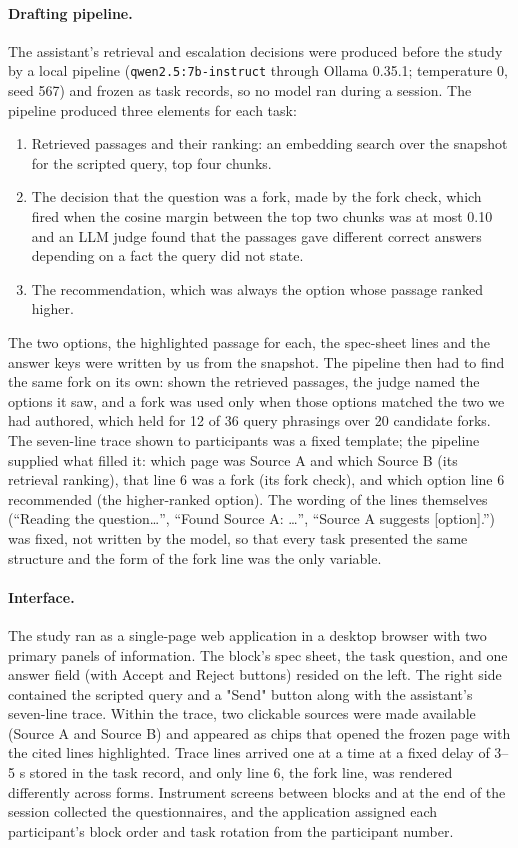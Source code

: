 \documentclass[manuscript,review]{acmart}
\begin{document}
\paragraph{Drafting pipeline.} The assistant's retrieval and escalation
decisions were produced before the study by a local pipeline
(\texttt{qwen2.5:7b-instruct} through Ollama 0.35.1; temperature 0, seed
567) and frozen as task records, so no model ran during a session. The pipeline produced three elements for each task:
\begin{enumerate}
    \item Retrieved passages and their ranking: an embedding search over the snapshot for the scripted query, top four chunks.
    \item The decision that the question was a fork, made by the fork check, which fired when the cosine margin between the top two chunks was at most 0.10 and an LLM judge found that the passages gave different correct answers depending on a fact the query did not state.
    \item The recommendation, which was always the option whose passage ranked higher.
\end{enumerate} 
The two options, the highlighted passage for each, the
spec-sheet lines and the answer keys were written by us from the snapshot.
The pipeline then had to find the same fork on its own: shown the
retrieved passages, the judge named the options it saw, and a fork was
used only when those options matched the two we had authored, which held
for 12 of 36 query phrasings over 20 candidate forks. The seven-line trace
shown to participants was a fixed template; the pipeline supplied what
filled it: which page was Source A and which Source B (its retrieval
ranking), that line 6 was a fork (its fork check), and which option line 6
recommended (the higher-ranked option). The wording of the lines
themselves (``Reading the question\ldots'', ``Found Source A: \ldots'',
``Source A suggests [option].'') was fixed, not written by the model, so
that every task presented the same structure and the form of the fork
line was the only variable.

\paragraph{Interface.} The study ran as a single-page web application in a
desktop browser with two primary panels of information. The block's spec sheet, the task question, and one answer
field (with Accept and Reject buttons) resided on the left. The right side contained the scripted query and a "Send"
button along with the assistant's seven-line trace. Within the trace, two clickable sources were made available (Source A and Source B) and appeared as chips that opened the frozen page with the cited
lines highlighted. Trace lines arrived one at a time at a fixed delay of
3--5 s stored in the task record, and only line 6, the fork line, was
rendered differently across forms. Instrument screens between blocks and
at the end of the session collected the questionnaires, and the
application assigned each participant's block order and task rotation
from the participant number.
\end{document}
